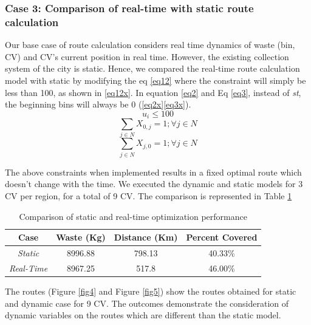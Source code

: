 \documentclass[12pt]{article}
\begin{document}
\subsubsection*{Case 3: Comparison of real-time with static route calculation}

Our base case of route calculation considers real time dynamics of waste (bin, CV) and CV's current position in real time. However, the existing collection system of the city is static. Hence, we compared the real-time route calculation model with static by modifying the eq \eqref{eq12} where the constraint will simply be less than 100, as shown in \eqref{eq12x}. In equation \eqref{eq2} and Eq \eqref{eq3}, instead of \textit{st}, the beginning bins will always be 0 (\eqref{eq2x}\eqref{eq3x}). 
\begin{equation}\label{eq12x}
    u_i\le 100
\end{equation}
\begin{equation}\label{eq2x}
    \sum_{j\in N}X_{0,j}=1 ; \forall j \in N
\end{equation}
\begin{equation}\label{eq3x}
    \sum_{j\in N}X_{j,0}=1 ; \forall j \in N
\end{equation}

The above constraints when implemented results in a fixed optimal route which doesn't change with the time. We executed the dynamic and static models for 3 CV per region, for a total of 9 CV. The comparison is represented in Table \ref{tab5}

\begin{table}[H]
    \centering
    \caption{Comparison of static and real-time optimization performance} \label{tab5}
    \vspace*{0.3cm}
    \begin{tabular}{|c|c|c|c|}
        \hline Case & Waste (Kg) & Distance (Km) & Percent Covered\\
        \hline \textit{Static}& 8996.88 & 798.13 & 40.33\%\\
        \hline \textit{Real-Time}& 8967.25 & 517.8 & 46.00\%\\
        \hline
    \end{tabular}
\end{table}

The routes (Figure \ref{fig4} and Figure \ref{fig5}) show the routes obtained for static and dynamic case for 9 CV. The outcomes demonstrate the consideration of dynamic variables on the routes which are different than the static model. 
\end{document}
